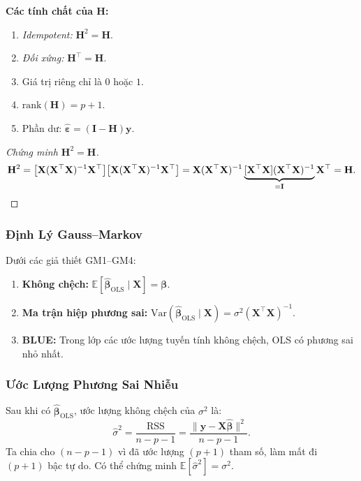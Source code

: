 \noindent\textbf{Các tính chất của $\mathbf{H}$:}
\begin{enumerate}
    \item \textit{Idempotent:} $\mathbf{H}^2 = \mathbf{H}$.
    \item \textit{Đối xứng:} $\mathbf{H}^\top = \mathbf{H}$.
    \item Giá trị riêng chỉ là $0$ hoặc $1$.
    \item $\mathrm{rank}(\mathbf{H}) = p+1$.
    \item Phần dư: $\hat{\boldsymbol{\varepsilon}} = (\mathbf{I} - \mathbf{H})\mathbf{y}$.
\end{enumerate}

\begin{proof}[Chứng minh $\mathbf{H}^2 = \mathbf{H}$]
\[
    \mathbf{H}^2
    = \bigl[\mathbf{X}(\mathbf{X}^\top\mathbf{X})^{-1}\mathbf{X}^\top\bigr]
      \bigl[\mathbf{X}(\mathbf{X}^\top\mathbf{X})^{-1}\mathbf{X}^\top\bigr]
    = \mathbf{X}(\mathbf{X}^\top\mathbf{X})^{-1}
      \underbrace{[\mathbf{X}^\top\mathbf{X}](\mathbf{X}^\top\mathbf{X})^{-1}}_{=\mathbf{I}}
      \mathbf{X}^\top
    = \mathbf{H}. \qedhere
\]
\end{proof}

\subsubsection{Định Lý Gauss--Markov}

\begin{theorem}
Dưới các giả thiết GM1--GM4:
\begin{enumerate}
    \item \textbf{Không chệch:} $\mathbb{E}[\hat{\boldsymbol{\beta}}_{\mathrm{OLS}} \mid \mathbf{X}] = \boldsymbol{\beta}$.
    \item \textbf{Ma trận hiệp phương sai:}
        $\mathrm{Var}(\hat{\boldsymbol{\beta}}_{\mathrm{OLS}} \mid \mathbf{X}) = \sigma^2(\mathbf{X}^\top\mathbf{X})^{-1}$.
    \item \textbf{BLUE:} Trong lớp các ước lượng tuyến tính không chệch,
        OLS có phương sai nhỏ nhất.
\end{enumerate}
\end{theorem}

\subsubsection{Ước Lượng Phương Sai Nhiễu}

Sau khi có $\hat{\boldsymbol{\beta}}_{\mathrm{OLS}}$, ước lượng không chệch của
$\sigma^2$ là:
\begin{equation}
    \hat{\sigma}^2 = \frac{\mathrm{RSS}}{n - p - 1}
                   = \frac{\|\mathbf{y} - \mathbf{X}\hat{\boldsymbol{\beta}}\|^2}{n - p - 1}.
\end{equation}
Ta chia cho $(n-p-1)$ vì đã ước lượng $(p+1)$ tham số, làm mất đi $(p+1)$ bậc tự do.
Có thể chứng minh $\mathbb{E}[\hat{\sigma}^2] = \sigma^2$.

